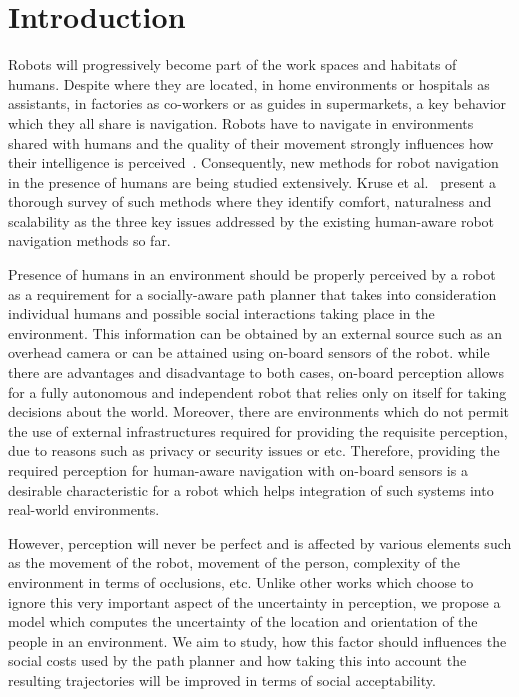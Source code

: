 \section{Introduction}


Robots will progressively become part of the work spaces and habitats of humans.
Despite where they are located, in home environments or hospitals as assistants, in factories as co-workers or as guides in supermarkets, a key behavior which they all share is navigation.
Robots have to navigate in environments shared with humans and the quality of their movement strongly influences  how their intelligence is perceived~\cite{Althaus2004}. Consequently, new methods for robot navigation in the presence of humans are being studied extensively. Kruse et al.~\cite{Kruse2013} present a thorough survey of such methods where they identify comfort, naturalness and scalability as the three key issues addressed by the existing human-aware robot navigation methods so far. %

Presence of humans in an environment should be properly perceived by a robot as a requirement for a socially-aware path planner that takes into consideration individual humans and possible social interactions taking place in the environment. This information can be obtained by an external source such as an overhead camera or can be attained using on-board sensors of the robot. while there are advantages and disadvantage to both cases, on-board perception allows for a fully autonomous and independent robot that relies only on itself for taking decisions about the world. Moreover, there are environments which do not permit the use of external infrastructures required for providing the requisite perception, due to reasons such as privacy or security issues or etc. Therefore, providing the required perception for human-aware navigation with on-board sensors is a desirable characteristic for a robot which helps integration of such systems into real-world environments.  


However, perception will never be perfect and is affected by various elements such as the movement of the robot, movement of the person, complexity of the environment in terms of occlusions, etc. Unlike other works which choose to ignore this very important aspect of the uncertainty in perception, we propose a model which computes the uncertainty of the location and orientation of the people in an environment. We aim to study, how this factor should influences the social costs used by the path planner and how taking this into account the resulting trajectories will be improved in terms of social acceptability.


